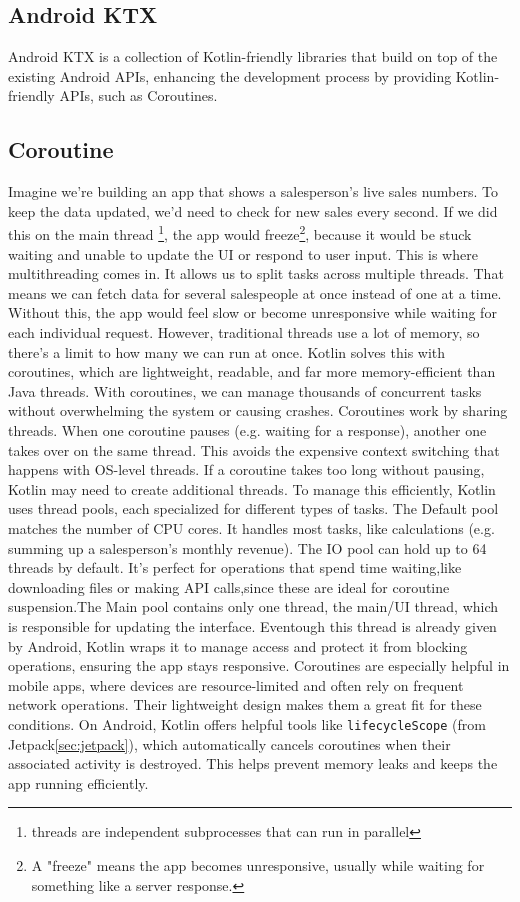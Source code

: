 \documentclass[a4paper,11pt]{article}
\begin{document}
\subsection{Android KTX}
Android KTX is a collection of Kotlin-friendly libraries that build on top of the existing Android APIs, enhancing the development process by providing Kotlin-friendly APIs, such as Coroutines.

\subsection{Coroutine}

Imagine we’re building an app that shows a salesperson’s live sales numbers. To keep the data updated, we’d need to check for new sales every second. If we did this on the main thread \footnote{threads are independent subprocesses that can run in parallel}, the app would freeze\footnote{A "freeze" means the app becomes unresponsive, usually while waiting for something like a server response.}, because it would be stuck waiting and unable to update the UI or respond to user input.
This is where multithreading comes in. It allows us to split tasks across multiple threads. That means we can fetch data for several salespeople at once instead of one at a time. Without this, the app would feel slow or become unresponsive while waiting for each individual request. However, traditional threads use a lot of memory, so there's a limit to how many we can run at once.
Kotlin solves this with coroutines, which are lightweight, readable, and far more memory-efficient than Java threads. With coroutines, we can manage thousands of concurrent tasks without overwhelming the system or causing crashes.
Coroutines work by sharing threads. When one coroutine pauses (e.g. waiting for a response), another one takes over on the same thread. This avoids the expensive context switching that happens with OS-level threads. If a coroutine takes too long without pausing, Kotlin may need to create additional threads.
To manage this efficiently, Kotlin uses thread pools, each specialized for different types of tasks. The Default pool matches the number of CPU cores. It handles most tasks, like calculations (e.g. summing up a salesperson’s monthly revenue). The IO pool can hold up to 64 threads by default. It’s perfect for operations that spend time waiting,like downloading files or making API calls,since these are ideal for coroutine suspension.The Main pool contains only one thread, the main/UI thread, which is responsible for updating the interface. Eventough this thread is already given by Android, Kotlin wraps it to manage access and protect it from blocking operations, ensuring the app stays responsive.
Coroutines are especially helpful in mobile apps, where devices are resource-limited and often rely on frequent network operations. Their lightweight design makes them a great fit for these conditions.
On Android, Kotlin offers helpful tools like \texttt{lifecycleScope} (from Jetpack\autoref{sec:jetpack}), which automatically cancels coroutines when their associated activity is destroyed. This helps prevent memory leaks and keeps the app running efficiently.
\end{document}
